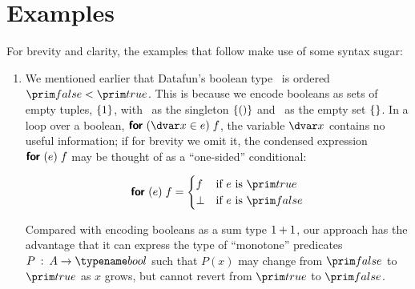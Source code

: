 \newcommand\notmember[2]{\neg \ebox{\mem \<\ebox{#1} \<{#2}}}
\renewcommand\notmember[2]{\ebox{#1} \not \in \ebox{#2}}

\section{Examples}
\label{examples}



For brevity and clarity, the examples that follow make use of some syntax sugar:

\begin{enumerate}

\item We mentioned earlier that Datafun's boolean type \tbool\ is ordered
  $\efalse < \etrue$. This is because we encode booleans as sets of empty
  tuples, $\{{1}\}$, with \etrue\ as the singleton $\{{({})}\}$
  and \efalse\ as the empty set $\{{}\}$. In a loop over a boolean,
  $\eforvar x e f$, the variable $\dvar x$ contains no useful information; if
  for brevity we omit it, the condensed expression $\textsf{\bfseries for}_{}\;({e})\; f$ may be thought
  of as a ``one-sided'' conditional:


  \begin{equation*}
    \efor{e} f =
    \begin{cases}
      f & \text{if }e\text{ is }\etrue\\
      \bot & \text{if }e\text{ is }\efalse
    \end{cases}
  \end{equation*}

  Compared with encoding booleans as a sum type \(1 + 1\), our
  approach has the advantage that it can express the type of ``monotone''
  predicates $P \isa A \to \tbool$ such that $P(x)$ may change from $\efalse$ to
  $\etrue$ as $x$ grows, but cannot revert from $\etrue$ to $\efalse$.




\end{enumerate}
